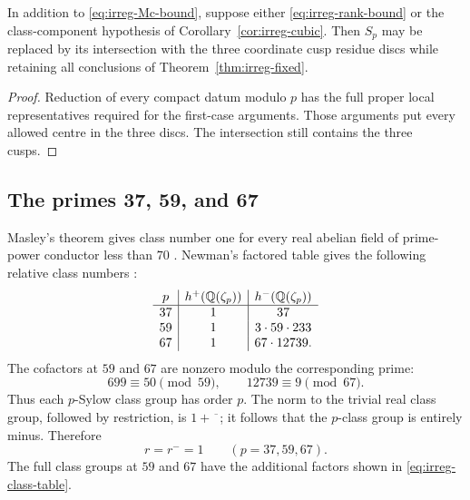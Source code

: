 \begin{corollary}\label{cor:irreg-fixed-discs}
In addition to \eqref{eq:irreg-Mc-bound}, suppose either
\eqref{eq:irreg-rank-bound} or the class-component hypothesis of
Corollary~\ref{cor:irreg-cubic}. Then \(S_p\) may be replaced by its
intersection with the three coordinate cusp residue discs while
retaining all conclusions of Theorem~\ref{thm:irreg-fixed}.
\end{corollary}

\begin{proof}
Reduction of every compact datum modulo \(p\) has the full proper
local representatives required for the first-case arguments.
Those arguments put every allowed centre in the three discs.
The intersection still contains the three cusps.
\end{proof}

\subsection{The primes 37, 59, and 67}
\label{sec:irreg-examples}

Masley's theorem gives class number one for every real abelian
field of prime-power conductor less than \(70\)
\cite[Theorem 3.2, p.~310]{Masley1978}. Newman's factored table gives
the following relative class numbers
\cite[Table 2, p.~218]{Newman1970}:
\begin{equation}
 \begin{array}{c|c|c}
 p&h^+(\mathbb Q(\zeta_p))&h^-(\mathbb Q(\zeta_p))\\ \hline
 37&1&37\\
 59&1&3\cdot59\cdot233\\
 67&1&67\cdot12739.
 \end{array}
 \label{eq:irreg-class-table}
\end{equation}
The cofactors at \(59\) and \(67\) are nonzero modulo the corresponding
prime:
\[
 699\equiv50\pmod{59},\qquad
 12739\equiv9\pmod{67}.
\]
Thus each \(p\)-Sylow class group has order \(p\). The norm to the
trivial real class group, followed by restriction, is \(1+\overline{\phantom{x}}\);
it follows that the \(p\)-class group is entirely minus. Therefore
\begin{equation}
 r=r^-=1\qquad(p=37,59,67).
 \label{eq:irreg-ranks-three}
\end{equation}
The full class groups at \(59\) and \(67\) have the additional factors
shown in \eqref{eq:irreg-class-table}.

